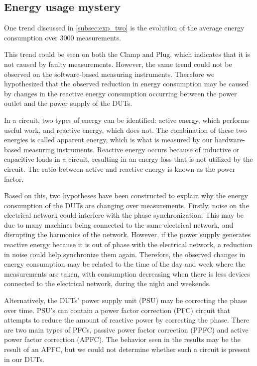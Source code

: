 \subsection{Energy usage mystery}
One trend discussed in \cref{subsec:exp_two} is the evolution of the average energy consumption over 3000 measurements.  



This trend could be seen on both the Clamp and Plug, which indicates that it is not caused by faulty measurements. However, the same trend could not be observed on the software-based measuring instruments. Therefore we hypothesized that the observed reduction in energy consumption may be caused by changes in the reactive energy consumption occurring between the power outlet and the power supply of the DUTs.

In a circuit, two types of energy can be identified: active energy, which performs useful work, and reactive energy, which does not. The combination of these two energies is called apparent energy, which is what is measured by our hardware-based measuring instruments. Reactive energy occurs because of inductive or capacitive loads in a circuit, resulting in an energy loss that is not utilized by the circuit\cite{ReactP}. The ratio between active and reactive energy is known as the power factor\cite{ReactP}.

Based on this, two hypotheses have been constructed to explain why the energy consumption of the DUTs are changing over measurements. Firstly, noise on the electrical network could interfere with the phase synchronization. This may be due to many machines being connected to the same electrical network, and disrupting the harmonics of the network\cite*{kullarkar2017power}. However, if the power supply generates reactive energy because it is out of phase with the electrical network, a reduction in noise could help synchronize them again. Therefore, the observed changes in energy consumption may be related to the time of the day and week where the measurements are taken, with consumption decreasing when there is less devices connected to the electrical network, during the night and weekends.

Alternatively, the DUTs' power supply unit (PSU) may be correcting the phase over time. PSU's can contain a power factor correction (PFC) circuit that attempts to reduce the amount of reactive power by correcting the phase. There are two main types of PFCs, passive power factor correction (PPFC) and active power factor correction (APFC)\cite{mcdonald2020power}. The behavior seen in the results may be the result of an APFC, but we could not determine whether such a circuit is present in our DUTs. %

